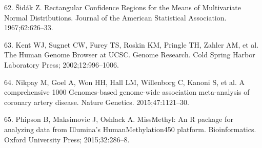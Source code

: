 \documentclass[]{bmcart}
\begin{document}
62. {Š}id{á}k Z. Rectangular Confidence Regions for the Means of
Multivariate Normal Distributions. Journal of the American Statistical
Association. 1967;62:626--33.

63. Kent WJ, Sugnet CW, Furey TS, Roskin KM, Pringle TH, Zahler AM, et
al. The Human Genome Browser at UCSC. Genome Research. Cold Spring
Harbor Laboratory Press; 2002;12:996--1006.

64. Nikpay M, Goel A, Won HH, Hall LM, Willenborg C, Kanoni S, et al. A
comprehensive 1000 Genomes-based genome-wide association meta-analysis
of coronary artery disease. Nature Genetics. 2015;47:1121--30.

65. Phipson B, Maksimovic J, Oshlack A. MissMethyl: An R package for
analyzing data from Illumina's HumanMethylation450 platform.
Bioinformatics. Oxford University Press; 2015;32:286--8.
\end{document}
